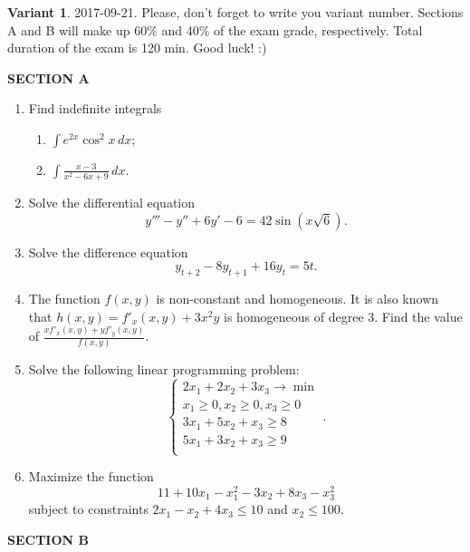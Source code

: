 \documentclass[12pt,a4paper]{article}
\begin{document}
\thispagestyle{empty}
\textbf{Variant 1}. 2017-09-21. Please, don't forget to write you variant number. Sections A and B will make up 60\% and 40\% of the exam grade, respectively. Total duration of the exam is 120 min. Good luck! :)


\textbf{SECTION A}

\begin{enumerate}

\item Find indefinite integrals
\begin{enumerate}
  \item  $\int {{e^{2x}}\cos^2 x \, dx}$;
  \item  $\int {\frac{{x - 3}}{{{x^2} - 6x + 9}} \, dx}$.
\end{enumerate}

\item Solve the differential equation
\[
y''' - y'' + 6y' - 6 = 42\sin (x\sqrt 6 ).
\]

\item Solve the difference equation
\[
{y_{t + 2}} - 8{y_{t + 1}} + 16{y_t} = 5t.
\]

\item The function $f(x, y)$ is non-constant and homogeneous. It is also known that $h(x, y) = f'_x(x, y) + 3x^2y$ is homogeneous of degree 3. Find the value of $\frac{xf'_x(x, y) + yf'_y(x, y)}{f(x, y)}$.

\item Solve the following linear programming problem:
\[
\begin{cases}
2x_1 + 2x_2 + 3x_3 \to \min \\
x_1 \geq 0, x_2 \geq 0, x_3 \geq 0 \\
3x_1 + 5x_2 + x_3 \geq 8 \\
5x_1 + 3x_2 + x_3 \geq 9 \\
\end{cases}.
\]

\item Maximize the function
\[
11 + 10x_1 - x_1^2 -3x_2 + 8x_3 - x_3^2
\]
subject to constraints $2x_1 -x_2+4x_3 \leq 10$ and $x_2 \leq 100$.

\end{enumerate}

\textbf{SECTION B}
\end{document}
